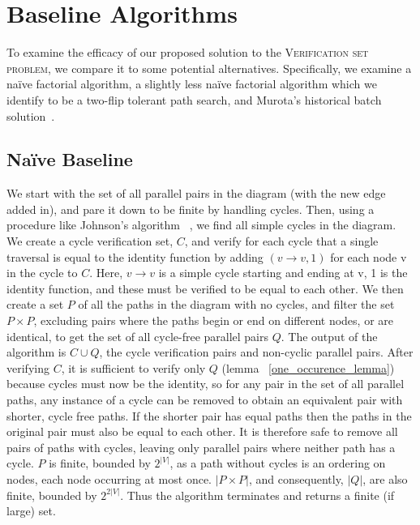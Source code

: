 \documentclass[sigplan,review,anonymous]{acmart}
\begin{document}
\section{Baseline Algorithms}

To examine the efficacy of our proposed solution to the \textsc{Verification set problem}, we compare it to some potential alternatives.
Specifically, we examine a na\"{i}ve factorial algorithm, a slightly less na\"{i}ve factorial algorithm which we identify to be a two-flip tolerant path search, and Murota's historical batch solution~\cite{commutative}.

\subsection{Na\"{i}ve Baseline}

We start with the set of all parallel pairs in the diagram (with the new edge added in), and pare it down to be finite by handling cycles.
Then, using a procedure like Johnson's algorithm ~\cite{johnson}, we find all simple cycles in the diagram. 
We create a cycle verification set, $C$, and verify for each cycle that a single traversal is equal to the identity function by adding $(v \rightarrow v, 1)$ for each node v in the cycle to $C$.
Here, $v \rightarrow v$ is a simple cycle starting and ending at v, 1 is the identity function, and these must be verified to be equal to each other.
We then create a set $P$ of all the paths in the diagram with no cycles, and filter the set $P \times P$, excluding pairs where the paths begin or end on different nodes, or are identical, to get the set of all cycle-free parallel pairs $Q$.
The output of the algorithm is $C \cup Q$, the cycle verification pairs and non-cyclic parallel pairs.
After verifying $C$, it is sufficient to verify only $Q$ (lemma ~\ref{one_occurence_lemma}) because cycles must now be the identity, so for any pair in the set of all parallel paths, any instance of a cycle can be removed to obtain an equivalent pair with shorter, cycle free paths.
If the shorter pair has equal paths then the paths in the original pair must also be equal to each other.
It is therefore safe to remove all pairs of paths with cycles, leaving only parallel pairs where neither path has a cycle.
$P$ is finite, bounded by $2^{|V|}$, as a path without cycles is an ordering on nodes, each node occurring at most once.
$|P \times P|$, and consequently, $|Q|$, are also finite, bounded by $2^{2|V|}$.
Thus the algorithm terminates and returns a finite (if large) set.
\end{document}
